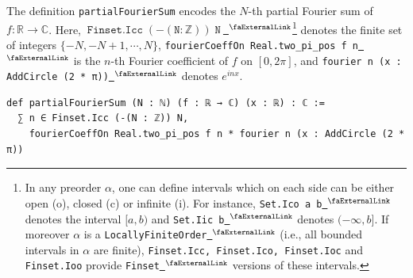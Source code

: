 \documentclass[12pt, reqno]{amsart}
\newcounter{lstlisting}[section]
\let\lean\lstinline
\newcommand{\mlean}[1]{\mathtt{\ #1\ }}
\newcommand*{\complex}{\mathbb{C}} %
\newcommand*{\real}{\mathbb{R}} %
\newcommand{\extlink}{~\ensuremath{{}^\text{\faExternalLink}}}
\theoremstyle{definition}
\theoremstyle{plain}
\begin{document}
The definition \lean{partialFourierSum} encodes the $N$-th partial Fourier sum of $f\colon\real \to\complex$. Here, $\mlean{Finset.Icc\;(-(N : \mathbb{Z}))\;N}$\href{https://github.com/leanprover-community/mathlib4/blob/b63493a4746b4651fceb3bcf3a4651cc36a4b8de/Mathlib/Order/Interval/Finset/Defs.lean#L280}{\extlink}\footnote{In any preorder $\alpha$, one can define intervals which on each side can be either open (o), closed (c) or infinite (i). For instance, \lean{Set.Ico a b}\href{https://github.com/leanprover-community/mathlib4/blob/b63493a4746b4651fceb3bcf3a4651cc36a4b8de/Mathlib/Order/Interval/Set/Defs.lean\#L59}{\extlink} denotes the interval $[a, b)$ and \lean{Set.Iic b}\href{https://github.com/leanprover-community/mathlib4/blob/b63493a4746b4651fceb3bcf3a4651cc36a4b8de/Mathlib/Order/Interval/Set/Defs.lean\#L44}{\extlink} denotes $(-\infty, b]$. If moreover $\alpha$ is a \lean{LocallyFiniteOrder}\href{https://github.com/leanprover-community/mathlib4/blob/b63493a4746b4651fceb3bcf3a4651cc36a4b8de/Mathlib/Order/Interval/Finset/Defs.lean\#L108-L124}{\extlink} (i.e., all bounded intervals in $\alpha$ are finite), \lean{Finset.Icc, Finset.Ico, Finset.Ioc} and \lean{Finset.Ioo} provide \lean{Finset}\href{https://github.com/leanprover-community/mathlib4/blob/b63493a4746b4651fceb3bcf3a4651cc36a4b8de/Mathlib/Data/Finset/Defs.lean\#L72-L79}{\extlink} versions of these intervals.
} denotes the finite set of integers $\{-N, -N + 1, \cdots, N\}$, \lean{fourierCoeffOn Real.two_pi_pos f n}\href{https://github.com/leanprover-community/mathlib4/blob/b63493a4746b4651fceb3bcf3a4651cc36a4b8de/Mathlib/Analysis/Fourier/AddCircle.lean#L351-L355}{\extlink} is the
$n$-th Fourier coefficient of $f$ on $[0, 2\pi]$, and \lean{fourier n (x : AddCircle (2 * π))}\href{https://github.com/leanprover-community/mathlib4/blob/b63493a4746b4651fceb3bcf3a4651cc36a4b8de/Mathlib/Analysis/Fourier/AddCircle.lean#L123-L125}{\extlink} denotes $e^{inx}$.
\begin{lstlisting}[mathescape]
def partialFourierSum (N : ℕ) (f : ℝ → ℂ) (x : ℝ) : ℂ :=
  ∑ n ∈ Finset.Icc (-(N : ℤ)) N,
    fourierCoeffOn Real.two_pi_pos f n * fourier n (x : AddCircle (2 * π))
\end{lstlisting}
\end{document}
